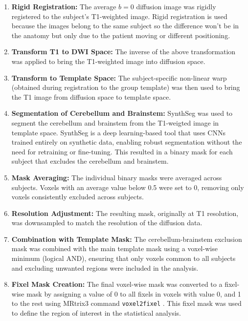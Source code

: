 \begin{enumerate}
    \item \textbf{Rigid Registration:} The average $b=0$ diffusion image was rigidly registered to the subject's T1-weighted image. Rigid registration is used because the images belong to the same subject so the difference won't be in the anatomy but only due to the patient moving or different positioning. 

    \item \textbf{Transform T1 to DWI Space:} The inverse of the above transformation was applied to bring the T1-weighted image into diffusion space.

    \item \textbf{Transform to Template Space:} The subject-specific non-linear warp (obtained during registration to the group template) was then used to bring the T1 image from diffusion space to template space.

    \item \textbf{Segmentation of Cerebellum and Brainstem:} SynthSeg \cite{billot2023} was used to segment the cerebellum and brainstem from the T1-weigted image in template space. SynthSeg is a deep learning-based tool that uses CNNs trained entirely on synthetic data, enabling robust segmentation without the need for retraining or fine-tuning. This resulted in a binary mask for each subject that excludes the cerebellum and brainstem.

    \item \textbf{Mask Averaging:} The individual binary masks were averaged across subjects. Voxels with an average value below 0.5 were set to 0, removing only voxels consistently excluded across subjects.

    \item \textbf{Resolution Adjustment:} The resulting mask, originally at T1 resolution, was downsampled to match the resolution of the diffusion data.

    \item \textbf{Combination with Template Mask:} The cerebellum-brainstem exclusion mask was combined with the main template mask using a voxel-wise minimum (logical AND), ensuring that only voxels common to all subjects and excluding unwanted regions were included in the analysis.

    \item \textbf{Fixel Mask Creation:} The final voxel-wise mask was converted to a fixel-wise mask by assigning a value of 0 to all fixels in voxels with value 0, and 1 to the rest using MRtrix3 command \texttt{voxel2fixel} \cite{Tournier2019}. This fixel mask was used to define the region of interest in the statistical analysis.
\end{enumerate}

